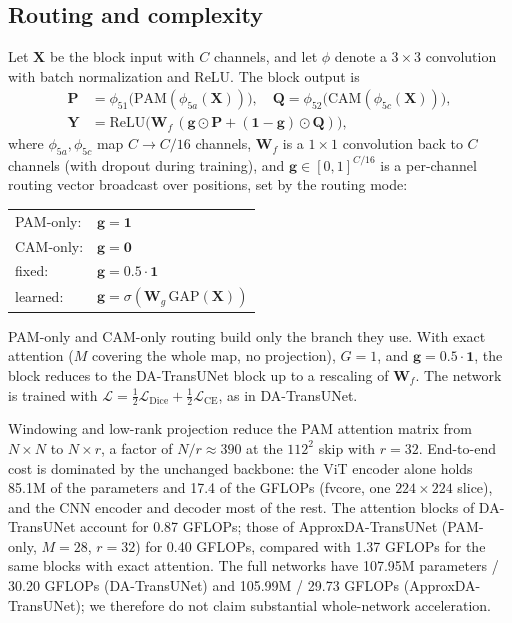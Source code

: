 \subsection{Routing and complexity}

Let $\mathbf{X}$ be the block input with $C$ channels, and let $\phi$ denote a $3{\times}3$ convolution with batch normalization and ReLU. The block output is
\begin{equation}
\begin{aligned}
  \mathbf{P} &= \phi_{51}\big(\mathrm{PAM}(\phi_{5a}(\mathbf{X}))\big), \quad
  \mathbf{Q} = \phi_{52}\big(\mathrm{CAM}(\phi_{5c}(\mathbf{X}))\big), \\
  \mathbf{Y} &= \mathrm{ReLU}\big(\mathbf{W}_f\,(\mathbf{g} \odot \mathbf{P} + (\mathbf{1}-\mathbf{g}) \odot \mathbf{Q})\big),
\end{aligned}
  \label{eq:fusion}
\end{equation}
where $\phi_{5a}, \phi_{5c}$ map $C \to C/16$ channels, $\mathbf{W}_f$ is a $1{\times}1$ convolution back to $C$ channels (with dropout during training), and $\mathbf{g} \in [0,1]^{C/16}$ is a per-channel routing vector broadcast over positions, set by the routing mode:
\begin{center}
\small
\begin{tabular}{@{}ll@{}}
  PAM-only: & $\mathbf{g} = \mathbf{1}$ \\
  CAM-only: & $\mathbf{g} = \mathbf{0}$ \\
  fixed:    & $\mathbf{g} = 0.5\cdot\mathbf{1}$ \\
  learned:  & $\mathbf{g} = \sigma(\mathbf{W}_g\,\mathrm{GAP}(\mathbf{X}))$ \\
\end{tabular}
\end{center}
PAM-only and CAM-only routing build only the branch they use. With exact attention ($M$ covering the whole map, no projection), $G{=}1$, and $\mathbf{g}{=}0.5\cdot\mathbf{1}$, the block reduces to the DA-TransUNet block up to a rescaling of $\mathbf{W}_f$.
The network is trained with $\mathcal{L} = \tfrac{1}{2}\mathcal{L}_{\mathrm{Dice}} + \tfrac{1}{2}\mathcal{L}_{\mathrm{CE}}$, as in DA-TransUNet.

Windowing and low-rank projection reduce the PAM attention matrix from $N{\times}N$ to $N{\times}r$, a factor of $N/r \approx 390$ at the $112^2$ skip with $r{=}32$. End-to-end cost is dominated by the unchanged backbone: the ViT encoder alone holds 85.1M of the parameters and 17.4 of the GFLOPs (fvcore, one $224{\times}224$ slice), and the CNN encoder and decoder most of the rest. The attention blocks of DA-TransUNet account for 0.87 GFLOPs; those of ApproxDA-TransUNet (PAM-only, $M{=}28$, $r{=}32$) for 0.40 GFLOPs, compared with 1.37 GFLOPs for the same blocks with exact attention. The full networks have 107.95M parameters / 30.20 GFLOPs (DA-TransUNet) and 105.99M / 29.73 GFLOPs (ApproxDA-TransUNet); we therefore do not claim substantial whole-network acceleration.
